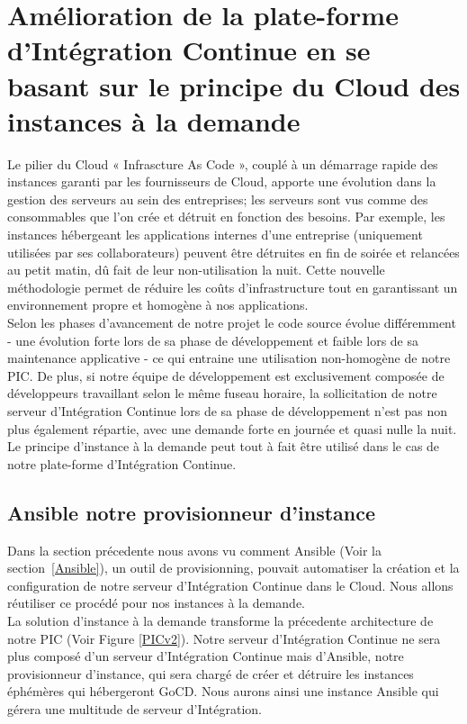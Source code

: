       \section{Amélioration de la plate-forme d'Intégration Continue en se basant sur le principe du Cloud des instances à la demande}
      Le pilier du Cloud « Infrascture As Code », couplé à un démarrage rapide des instances garanti par les fournisseurs de Cloud, apporte une évolution dans la gestion des serveurs au sein des entreprises; les serveurs sont vus comme des consommables que l'on crée et détruit en fonction des besoins. Par exemple, les instances hébergeant les applications internes d'une entreprise (uniquement utilisées par ses collaborateurs) peuvent être détruites en fin de soirée et relancées au petit matin, dû fait de leur non-utilisation la nuit. Cette nouvelle méthodologie permet de réduire les coûts d'infrastructure tout en garantissant un environnement propre et homogène à nos applications.\\

      Selon les phases d'avancement de notre projet le code source évolue différemment - une évolution forte lors de sa phase de développement et faible lors de sa maintenance applicative - ce qui entraine une utilisation non-homogène de notre PIC. De plus, si notre équipe de développement est exclusivement composée de développeurs travaillant selon le même fuseau horaire, la sollicitation de notre serveur d'Intégration Continue lors de sa phase de développement n'est pas non plus également répartie, avec une demande forte en journée et quasi nulle la nuit. Le principe d'instance à la demande peut tout à fait être utilisé dans le cas de notre plate-forme d'Intégration Continue.\\

        \subsection{Ansible notre provisionneur d'instance}
        Dans la section précedente nous avons vu comment Ansible (Voir la section~\ref{Ansible}), un outil de provisionning, pouvait automatiser la création et la configuration de notre serveur d'Intégration Continue dans le Cloud. Nous allons réutiliser ce procédé pour nos instances à la demande.\\

        La solution d'instance à la demande transforme la précedente architecture de notre PIC (Voir Figure \ref{PICv2}). Notre serveur d'Intégration Continue ne sera plus composé d'un serveur d'Intégration Continue mais d'Ansible, notre provisionneur d'instance, qui sera chargé de créer et détruire les instances éphémères qui hébergeront GoCD. Nous aurons ainsi une instance Ansible qui gérera une multitude de serveur d'Intégration.

